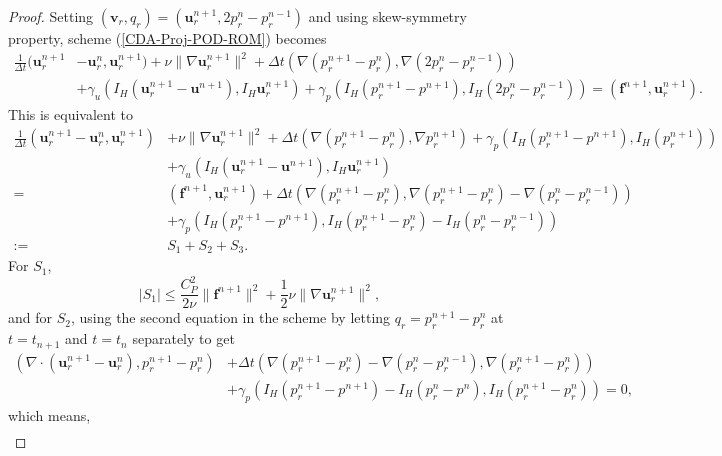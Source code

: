\documentclass[10pt,twoside,openany,UTF8,CJK]{article}
\begin{document}
	\begin{proof}
		Setting $(\boldsymbol{v}_r,q_r) = (\boldsymbol{u}^{n+1}_r, 2p^n_r - p^{n-1}_r)$ and using skew-symmetry property, scheme (\ref{CDA-Proj-POD-ROM}) becomes
		$$
		\begin{aligned}
			\frac{1}{\Delta t}(\boldsymbol{u}^{n+1}_r &- \boldsymbol{u}^{n}_r, \boldsymbol{u}^{n+1}_r) + \nu\|\nabla \boldsymbol{u}^{n+1}_r\|^2 + \Delta t\left(\nabla(p^{n+1}_r - p^{n}_r), \nabla(2p^{n}_r - p^{n-1}_r)\right) \\
			&+ \gamma_u(I_H(\boldsymbol{u}_r^{n+1} - \boldsymbol{u}^{n+1}), I_H\boldsymbol{u}^{n+1}_r) + \gamma_p\left(I_H(p^{n+1}_r - p^{n+1}), I_H(2p^{n}_r - p^{n-1}_r)\right) = (\boldsymbol{f}^{n+1}, \boldsymbol{u}^{n+1}_r).
		\end{aligned}
		$$
		This is equivalent to
		$$
		\begin{aligned}
			\frac{1}{\Delta t}\left(\boldsymbol{u}^{n+1}_r - \boldsymbol{u}^{n}_r, \boldsymbol{u}^{n+1}_r\right) &+ \nu\|\nabla \boldsymbol{u}^{n+1}_r\|^2 + \Delta t\left(\nabla(p^{n+1}_r - p^{n}_r), \nabla p^{n+1}_r\right) + \gamma_p\left(I_H(p^{n+1}_r - p^{n+1}), I_H(p^{n+1}_r)\right) \\
			&+ \gamma_u(I_H(\boldsymbol{u}_r^{n+1} - \boldsymbol{u}^{n+1}), I_H\boldsymbol{u}^{n+1}_r) \\
			=& (\boldsymbol{f}^{n+1}, \boldsymbol{u}^{n+1}_r) + \Delta t\left(\nabla(p^{n+1}_r - p^{n}_r), \nabla(p^{n+1}_r - p^{n}_r) - \nabla(p^{n}_r - p^{n-1}_r)\right) \\
			&+ \gamma_p\left(I_H(p^{n+1}_r - p^{n+1}), I_H(p^{n+1}_r - p^{n}_r) - I_H(p^{n}_r - p^{n-1}_r)\right) \\
			:=& S_1 + S_2 + S_3.
		\end{aligned}
		$$
		For $S_1$,
		$$
		|S_1| \leq \frac{C^2_{P}}{2\nu}\|\boldsymbol{f}^{n+1}\|^2 + \frac12\nu\|\nabla \boldsymbol{u}^{n+1}_r\|^2,
		$$
		and for $S_2$, using the second equation in the scheme by letting $q_r=p^{n+1}_r-p^n_r$ at $t=t_{n+1}$ and $t=t_n$ separately to get
		$$
		\begin{aligned}
			\left(\nabla \cdot (\boldsymbol{u}_r^{n+1} - \boldsymbol{u}_r^{n}), p^{n+1}_r-p^n_r\right) &+  \Delta t\left(\nabla\left(p_r^{n+1}-p_r^n\right) - \nabla\left(p_r^{n}-p_r^{n-1}\right), \nabla (p^{n+1}_r-p^n_r)\right) \\
			&+ \gamma_p(I_H(p_r^{n+1} - p^{n+1}) - I_H(p_r^{n} - p^{n}), I_H(p^{n+1}_r-p^n_r)) = 0,
	    \end{aligned}
		$$
		which means,
		$$
		\begin{aligned}

\end{aligned}$$
\end{proof}
\end{document}
